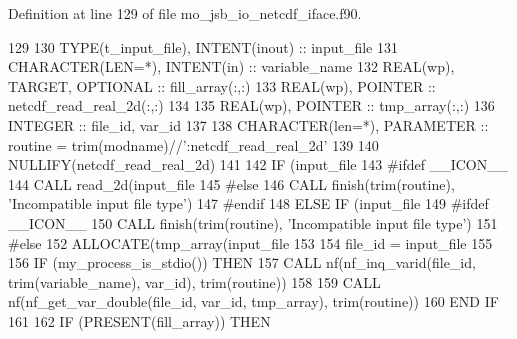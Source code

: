 Definition at line 129 of file mo\+\_\+jsb\+\_\+io\+\_\+netcdf\+\_\+iface.\+f90.


\begin{DoxyCode}
129 
130     \textcolor{keywordtype}{TYPE}(t\_input\_file), \textcolor{keywordtype}{INTENT(inout)} :: input\_file
131     \textcolor{keywordtype}{CHARACTER(LEN=*)},   \textcolor{keywordtype}{INTENT(in)}    :: variable\_name
132     \textcolor{keywordtype}{REAL(wp)}, \textcolor{keywordtype}{TARGET}, \textcolor{keywordtype}{OPTIONAL}        :: fill\_array(:,:)
133     \textcolor{keywordtype}{REAL(wp)}, \textcolor{keywordtype}{POINTER}                 :: netcdf\_read\_real\_2d(:,:)
134 
135     \textcolor{keywordtype}{REAL(wp)}, \textcolor{keywordtype}{POINTER} :: tmp\_array(:,:)
136     \textcolor{keywordtype}{INTEGER} :: file\_id, var\_id
137 
138     \textcolor{keywordtype}{CHARACTER(len=*)}, \textcolor{keywordtype}{PARAMETER} :: routine = trim(modname)//\textcolor{stringliteral}{':netcdf\_read\_real\_2d'}
139 
140     \textcolor{keyword}{NULLIFY}(netcdf\_read\_real\_2d)
141 
142     \textcolor{keywordflow}{IF} (input\_file%
143 \textcolor{preprocessor}{#ifdef \_\_ICON\_\_}
144 \textcolor{preprocessor}{}      \textcolor{keyword}{CALL }read\_2d(input\_file%
145 \textcolor{preprocessor}{#else}
146 \textcolor{preprocessor}{}      \textcolor{keyword}{CALL }finish(trim(routine), \textcolor{stringliteral}{'Incompatible input file type'})
147 \textcolor{preprocessor}{#endif}
148 \textcolor{preprocessor}{}    \textcolor{keywordflow}{ELSE} \textcolor{keywordflow}{IF} (input\_file%
149 \textcolor{preprocessor}{#ifdef \_\_ICON\_\_}
150 \textcolor{preprocessor}{}      \textcolor{keyword}{CALL }finish(trim(routine), \textcolor{stringliteral}{'Incompatible input file type'})
151 \textcolor{preprocessor}{#else}
152 \textcolor{preprocessor}{}      \textcolor{keyword}{ALLOCATE}(tmp\_array(input\_file%
153 
154       file\_id = input\_file%
155 
156       \textcolor{keywordflow}{IF} (my\_process\_is\_stdio()) \textcolor{keywordflow}{THEN}
157         \textcolor{keyword}{CALL }nf(nf\_inq\_varid(file\_id, trim(variable\_name), var\_id), trim(routine))
158 
159         \textcolor{keyword}{CALL }nf(nf\_get\_var\_double(file\_id, var\_id, tmp\_array), trim(routine))
160 \textcolor{keywordflow}{      END IF}
161 
162       \textcolor{keywordflow}{IF} (\textcolor{keyword}{PRESENT}(fill\_array)) \textcolor{keywordflow}{THEN}

\end{DoxyCode}

